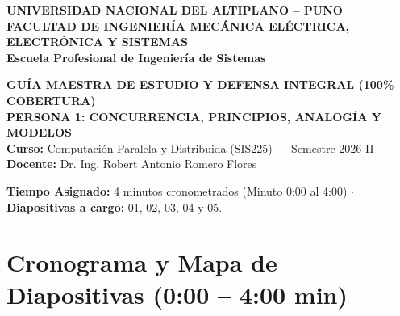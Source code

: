 \documentclass[11pt,a4paper]{article}
\begin{document}
\begin{center}
    {\Large\textbf{\color{primaryNavy}UNIVERSIDAD NACIONAL DEL ALTIPLANO -- PUNO}}\\[2mm]
    {\large\textbf{\color{secondaryOcean}FACULTAD DE INGENIERÍA MECÁNICA ELÉCTRICA, ELECTRÓNICA Y SISTEMAS}}\\[1mm]
    {\textbf{Escuela Profesional de Ingeniería de Sistemas}}\\[4mm]
    
    \begin{tcolorbox}[colback=primaryNavy,colframe=primaryNavy,arc=4mm,center,width=0.95\textwidth]
        \centering\color{white}
        \Large\textbf{GUÍA MAESTRA DE ESTUDIO Y DEFENSA INTEGRAL (100\% COBERTURA)}\\[1.5mm]
        \large\textbf{PERSONA 1: CONCURRENCIA, PRINCIPIOS, ANALOGÍA Y MODELOS}\\[1mm]
        \small\textbf{Curso:} Computación Paralela y Distribuida (SIS225) --- Semestre 2026-II\\
        \small\textbf{Docente:} Dr. Ing. Robert Antonio Romero Flores
    \end{tcolorbox}
\end{center}

\vspace{2mm}
\noindent\textbf{Tiempo Asignado:} 4 minutos cronometrados (Minuto 0:00 al 4:00) $\cdot$ \textbf{Diapositivas a cargo:} 01, 02, 03, 04 y 05.

\section{Cronograma y Mapa de Diapositivas (0:00 -- 4:00 min)}
\end{document}
